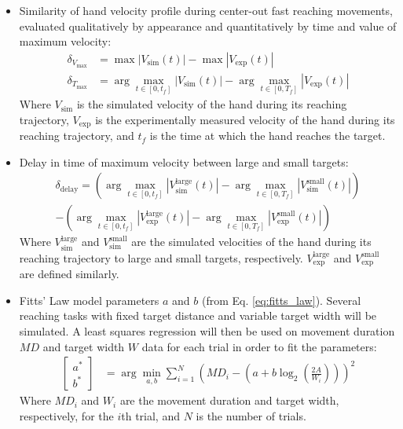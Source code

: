 \documentclass[table,12pt]{article}
\begin{document}
\begin{itemize}
    \item Similarity of hand velocity profile during center-out fast reaching movements, evaluated qualitatively by appearance and quantitatively by time and value of maximum velocity:
    \begin{align}
        \delta_{V_{\text{max}}} &= \max \left|V_{\text{sim}}(t)\right| - \max \left|V_{\text{exp}}(t)\right| \\
        \delta_{T_{\text{max}}} &= \arg\max_{t \in [0, t_f]} \left|V_{\text{sim}}(t)\right| - \arg\max_{t \in [0, T_f]} \left|V_{\text{exp}}(t)\right|
    \end{align}
    Where $V_{\text{sim}}$ is the simulated velocity of the hand during its reaching trajectory, $V_{\text{exp}}$ is the experimentally measured velocity of the hand during its reaching trajectory, and $t_f$ is the time at which the hand reaches the target.

    \item Delay in time of maximum velocity between large and small targets:
    \begin{multline*}
        \delta_{\text{delay}} = \left(\arg\max_{t \in [0, t_f]} \left|V_{\text{sim}}^{\text{large}}(t)\right| - \arg\max_{t \in [0, T_f]} \left|V_{\text{sim}}^{\text{small}}(t)\right|\right) \\
        - \left(\arg\max_{t \in [0, t_f]} \left|V_{\text{exp}}^{\text{large}}(t)\right| - \arg\max_{t \in [0, T_f]} \left|V_{\text{exp}}^{\text{small}}(t)\right|\right)
    \end{multline*}
    Where $V_{\text{sim}}^{\text{large}}$ and $V_{\text{sim}}^{\text{small}}$ are the simulated velocities of the hand during its reaching trajectory to large and small targets, respectively. $V_{\text{exp}}^{\text{large}}$ and $V_{\text{exp}}^{\text{small}}$ are defined similarly.
    \item Fitts' Law model parameters $a$ and $b$ (from Eq. \ref{eq:fitts_law}). 
    Several reaching tasks with fixed target distance and variable target width will be simulated. A least squares regression will then be used on movement duration $MD$ and target width $W$ data for each trial in order to fit the parameters:
    \begin{align}
        \begin{bmatrix}
            a^* \\ b^*
        \end{bmatrix} &= \arg\min_{a, b} \sum_{i=1}^N \left(MD_i - \left(a + b \log_2\left(\frac{2A}{W_i}\right)\right)\right)^2
    \end{align}
    Where $MD_i$ and $W_i$ are the movement duration and target width, respectively, for the $i$th trial, and $N$ is the number of trials.
\end{itemize}
\end{document}
